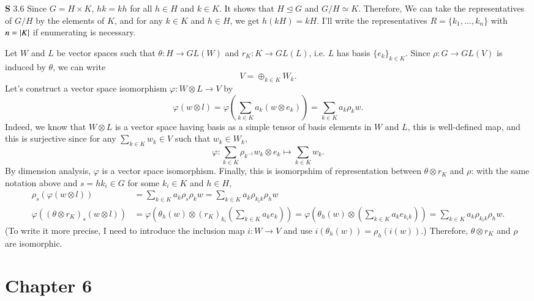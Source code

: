 \documentclass[a4paper, 12pt]{article}
\theoremstyle{Mydefinition}
\theoremstyle{Mytheorem}
\begin{document}
\noindent \textbf{S} 3.6
Since $G=H\times K$, $hk=kh$ for all $h\in H$ and $k\in K$. It shows that $H \trianglelefteq G$ and $G/H\simeq K$. Therefore, We can take the representatives of $G/H$ by the elements of $K$, and for any $k\in K$ and $h\in H$, we get $h(kH) = kH$. I'll write the representatives $R = \{k_1, \ldots, k_n\}$ with $n=\abs{K}$ if enumerating is necessary.

Let $W$ and $L$ be vector spaces such that $\theta:H\rightarrow GL(W)$ and $r_K:K\rightarrow GL(L)$, i.e. $L$ has basis $\{e_k\}_{k\in K}$. Since $\rho:G\rightarrow GL(V)$ is induced by $\theta$, we can write
\begin{equation}
    V= \oplus_{k\in K}W_k.
\end{equation}
Let's construct a vector space isomorphism $\varphi:W\otimes L\rightarrow V$ by
\begin{equation}
    \varphi(w\otimes l) = \varphi(\sum_{k\in K}a_k(w\otimes e_k)) = \sum_{k\in K}a_k\rho_k w.
\end{equation}
Indeed, we know that $W\otimes L$ is a vector space having basis as a simple tensor of basis elements in $W$ and $L$, this is well-defined map, and this is surjective since for any $\sum_{k\in K}w_k\in V$ such that $w_k\in W_k$,
\begin{equation}
    \varphi:\sum_{k\in K}\rho_{k^{-1}}w_k\otimes e_k\mapsto \sum_{k\in K}w_k.
\end{equation}
By dimension analysis, $\varphi$ is a vector space isomorphism. Finally, this is isomorpshim of representation between $\theta\otimes r_K$ and $\rho$: with the same notation above and $s = hk_i\in G$ for some $k_i\in K$ and $h\in H$,
\begin{equation}
    \begin{split}
        \rho_s(\varphi(w\otimes l)) &=\sum_{k\in K}a_k\rho_s\rho_kw = \sum_{k\in K} a_k\rho_{k_ik}\rho_hw\\
        \varphi\left(\left(\theta\otimes r_K\right)_s(w\otimes l)\right) &= \varphi\left(\theta_h(w)\otimes (r_K)_{k_i}\left(\sum_{k\in K}a_ke_k\right)\right) = \varphi\left(\theta_h(w)\otimes \left(\sum_{k\in K}a_ke_{k_ik}\right)\right) = \sum_{k\in K}a_k\rho_{k_ik}\rho_hw.
    \end{split}
\end{equation}
(To write it more precise, I need to introduce the inclusion map $i:W\rightarrow V$ and use $i(\theta_h(w)) = \rho_h(i(w))$.) Therefore, $\theta\otimes r_K$ and $\rho$ are isomorphic.

\newpage
\section{Chapter 6}
\end{document}
